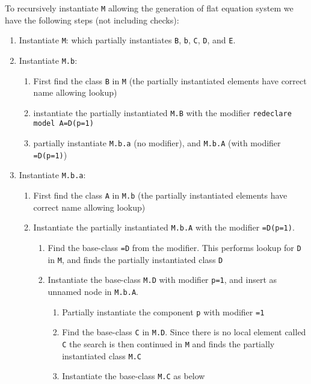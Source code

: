 \begin{example}
To recursively instantiate \lstinline!M! allowing the generation of flat
equation system we have the following steps (not including checks):
\begin{enumerate}
\item
  Instantiate \lstinline!M!: which partially instantiates \lstinline!B!, \lstinline!b!, \lstinline!C!, \lstinline!D!, and \lstinline!E!.
\item
  Instantiate \lstinline!M.b!:
  \begin{enumerate}
  \item
    First find the class \lstinline!B! in \lstinline!M! (the partially instantiated elements have correct name allowing lookup)
  \item
    instantiate the partially instantiated \lstinline!M.B! with the modifier \lstinline!redeclare model A=D(p=1)!
  \item
    partially instantiate \lstinline!M.b.a! (no modifier), and \lstinline!M.b.A! (with modifier \lstinline!=D(p=1)!)
  \end{enumerate}
\item
  Instantiate \lstinline!M.b.a!:
  \begin{enumerate}
  \item
    First find the class \lstinline!A! in \lstinline!M.b! (the partially instantiated elements have correct name allowing lookup)
  \item
    Instantiate the partially instantiated \lstinline!M.b.A! with the modifier \lstinline!=D(p=1)!.
    \begin{enumerate}
    \item
      Find the base-class \lstinline!=D! from the modifier.  This performs lookup for \lstinline!D! in \lstinline!M!, and finds the partially instantiated class \lstinline!D!
    \item
      Instantiate the base-class \lstinline!M.D! with modifier \lstinline!p=1!, and insert as unnamed node in \lstinline!M.b.A!.
      \begin{enumerate}
      \item
        Partially instantiate the component \lstinline!p! with modifier \lstinline!=1!
      \item
        Find the base-class \lstinline!C! in \lstinline!M.D!. Since there is no local element called \lstinline!C! the search is then continued in \lstinline!M! and finds
        the partially instantiated class \lstinline!M.C!
      \item
        Instantiate the base-class \lstinline!M.C! as below

\end{enumerate}
\end{enumerate}
\end{enumerate}
\end{enumerate}
\end{example}
